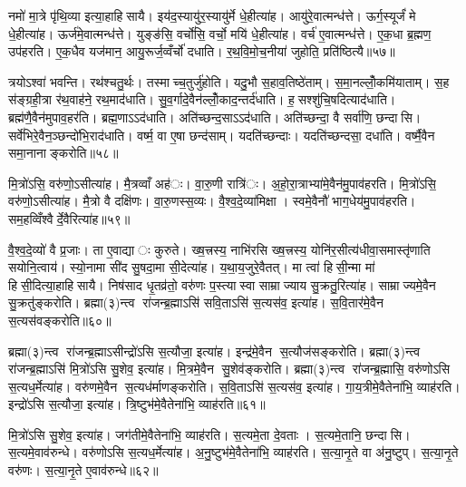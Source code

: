 नमो॑ मा॒त्रे पृ॑थि॒व्या इत्या॒हाहिसायै। इय॑द॒स्यायु॑र॒स्यायु॑र्मे धे॒हीत्या॑ह। आयु॑रे॒वात्मन्ध॑त्ते। ऊर्ग॒स्यूर्जं॑ मे धे॒हीत्या॑ह। ऊर्ज॑मे॒वात्मन्ध॑त्ते। युङ्ङ॑सि॒ वर्चो॑सि॒ वर्चो॒ मयि॑ धे॒हीत्या॑ह। वर्च॑ ए॒वात्मन्ध॑त्ते। ए॒क॒धा ब्र॒ह्मण॒ उप॑हरति। ए॒क॒धैव यज॑मान॒ आयु॒रूर्ज॒व्वँर्चो॑ दधाति। र॒थ॒वि॒मो॒च॒नीया॑ जुहोति॒ प्रति॑ष्ठित्यै॥५७॥

त्रयोऽश्वा॑ भवन्ति। रथ॑श्चतु॒र्थः। तस्माच्च॒तुर्जु॑होति। यदु॒भौ स॒हाव॒तिष्ठे॑ताम्। स॒मा॒नल्लोँ॒कमि॑याताम्। स॒ह स॑ङ्ग्रही॒त्रा र॑थ॒वाह॑ने॒ रथ॒माद॑धाति। सु॒व॒र्गादे॒वैन॑ल्लोँ॒काद॒न्तर्द॑धाति। ह॒सश्शु॑चि॒षदित्याद॑धाति। ब्रह्म॑णै॒वैन॑मुपाव॒हर॑ति। ब्रह्म॒णाऽऽद॑धाति। अति॑च्छन्द॒साऽऽद॑धाति। अति॑च्छन्दा॒ वै सर्वा॑णि॒ छन्दासि। सर्वे॑भिरे॒वैन॒ञ्छन्दो॑भि॒राद॑धाति। वर्ष्म॒ वा ए॒षा छन्द॑साम्। यदति॑च्छन्दाः। यदति॑च्छन्दसा॒ दधा॑ति। वर्ष्मै॒वैन समा॒नानाङ्करोति॥५८॥


मि॒त्रो॑ऽसि॒ वरु॑णो॒ऽसीत्या॑ह। मै॒त्रव्वाँ अह॑ः। वा॒रु॒णी रात्रि॑ः। अ॒हो॒रा॒त्राभ्या॑मे॒वैन॑मु॒पाव॑हरति। मि॒त्रो॑ऽसि॒ वरु॑णो॒ऽसीत्या॑ह। मै॒त्रो वै दक्षि॑णः। वा॒रु॒णस्स॒व्यः। वै॒श्व॒दे॒व्या॑मिक्षा। स्वमे॒वैनौ॑ भाग॒धेय॑मु॒पाव॑हरति। सम॒हव्विँश्वैर्दे॒वैरित्या॑ह॥५९॥

वै॒श्व॒दे॒व्यो॑ वै प्र॒जाः। ता ए॒वाद्याः कुरुते। ख्ष॒त्त्रस्य॒ नाभि॑रसि ख्ष॒त्त्रस्य॒ योनि॑र॒सीत्य॑धीवा॒समास्तृ॑णाति सयोनि॒त्वाय॑। स्यो॒नामा सी॑द सु॒षदा॒मा सी॒देत्या॑ह। य॒था॒य॒जुरे॒वैतत्। मा त्वा॑ हिसी॒न्मा मा॑ हिसी॒दित्या॒हाहिसायै। निष॑साद धृ॒तव्र॑तो॒ वरु॑णः प॒स्त्यास्वा साम्राज्याय सु॒क्रतु॒रित्या॑ह। साम्राज्यमे॒वैन सु॒क्रतु॑ङ्करोति। ब्रह्मा(३)न्त्व रा॑जन्ब्र॒ह्माऽसि॑ सवि॒ताऽसि॑ स॒त्यस॑व॒ इत्या॑ह। स॒वि॒तार॑मे॒वैन स॒त्यस॑वङ्करोति॥६०॥

ब्रह्मा(३)न्त्व रा॑जन्ब्र॒ह्माऽसीन्द्रो॑ऽसि स॒त्यौजा॒ इत्या॑ह। इन्द्र॑मे॒वैन स॒त्यौज॑सङ्करोति। ब्रह्मा(३)न्त्व रा॑जन्ब्र॒ह्माऽसि॑ मि॒त्रो॑ऽसि सु॒शेव॒ इत्या॑ह। मि॒त्रमे॒वैन सु॒शेव॑ङ्करोति। ब्रह्मा(३)न्त्व रा॑जन्ब्र॒ह्मासि॒ वरु॑णोऽसि स॒त्यध॒र्मेत्या॑ह। वरु॑णमे॒वैन स॒त्यध॑र्माणङ्करोति। स॒वि॒ताऽसि॑ स॒त्यस॑व॒ इत्या॑ह। गा॒य॒त्रीमे॒वैतेना॑भि॒ व्याह॑रति। इन्द्रो॑ऽसि स॒त्यौजा॒ इत्या॑ह। त्रि॒ष्टुभ॑मे॒वैतेना॑भि॒ व्याह॑रति॥६१॥

मि॒त्रो॑ऽसि सु॒शेव॒ इत्या॑ह। जग॑तीमे॒वैतेना॑भि॒ व्याह॑रति। स॒त्यमे॒ता दे॒वताः। स॒त्यमे॒तानि॒ छन्दासि। स॒त्यमे॒वाव॑रुन्धे। वरु॑णोऽसि स॒त्यध॒र्मेत्या॑ह। अ॒नु॒ष्टुभ॑मे॒वैतेना॑भि॒ व्याह॑रति। स॒त्या॒नृ॒ते वा अ॑नु॒ष्टुप्। स॒त्या॒नृ॒ते वरु॑णः। स॒त्या॒नृ॒ते ए॒वाव॑रुन्धे॥६२॥


